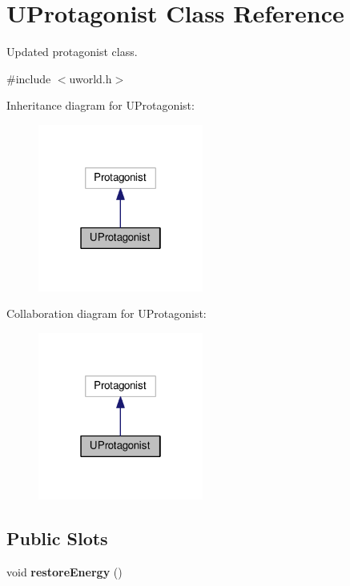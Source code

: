 \hypertarget{classUProtagonist}{}\section{U\+Protagonist Class Reference}
\label{classUProtagonist}


Updated protagonist class.  




{\ttfamily \#include $<$uworld.\+h$>$}



Inheritance diagram for U\+Protagonist\+:
\nopagebreak
\begin{figure}[H]
\begin{center}
\leavevmode
\includegraphics[width=154pt]{d8/da2/classUProtagonist__inherit__graph}
\end{center}
\end{figure}


Collaboration diagram for U\+Protagonist\+:
\nopagebreak
\begin{figure}[H]
\begin{center}
\leavevmode
\includegraphics[width=154pt]{df/d4d/classUProtagonist__coll__graph}
\end{center}
\end{figure}
\subsection*{Public Slots}
\begin{DoxyCompactItemize}
\item 
void {\bfseries restore\+Energy} ()\hypertarget{classUProtagonist_aafceebba330665d6c8cf6943515526d5}{}\label{classUProtagonist_aafceebba330665d6c8cf6943515526d5}

\end{DoxyCompactItemize}
